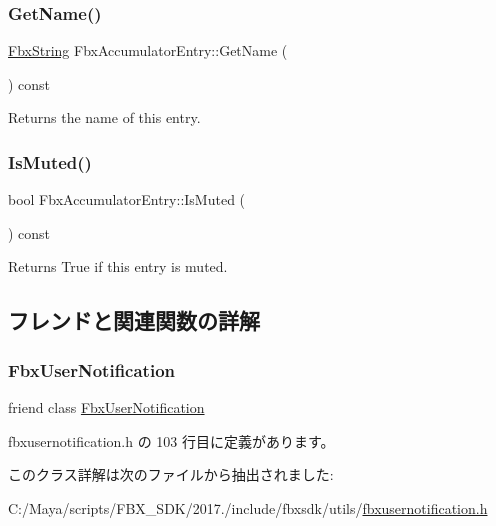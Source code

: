\mbox{\label{class_fbx_accumulator_entry_a0dbcb9bc95c823b84a8679f781d35317}} 
\subsubsection{\texorpdfstring{Get\+Name()}{GetName()}}
{\footnotesize\ttfamily \hyperlink{class_fbx_string}{Fbx\+String} Fbx\+Accumulator\+Entry\+::\+Get\+Name (\begin{DoxyParamCaption}{ }\end{DoxyParamCaption}) const}



Returns the name of this entry. 

\mbox{\label{class_fbx_accumulator_entry_ac7c575cce1b36df854f30ed8beb82260}} 
\subsubsection{\texorpdfstring{Is\+Muted()}{IsMuted()}}
{\footnotesize\ttfamily bool Fbx\+Accumulator\+Entry\+::\+Is\+Muted (\begin{DoxyParamCaption}{ }\end{DoxyParamCaption}) const}



Returns True if this entry is muted. 



\subsection{フレンドと関連関数の詳解}
\mbox{\label{class_fbx_accumulator_entry_a59b31f76d63ab836d795cdd0188a201a}} 
\subsubsection{\texorpdfstring{Fbx\+User\+Notification}{FbxUserNotification}}
{\footnotesize\ttfamily friend class \hyperlink{class_fbx_user_notification}{Fbx\+User\+Notification}\hspace{0.3cm}{\ttfamily [friend]}}



 fbxusernotification.\+h の 103 行目に定義があります。



このクラス詳解は次のファイルから抽出されました\+:\begin{DoxyCompactItemize}
\item 
C\+:/\+Maya/scripts/\+F\+B\+X\+\_\+\+S\+D\+K/2017./include/fbxsdk/utils/\hyperlink{fbxusernotification_8h}{fbxusernotification.\+h}\end{DoxyCompactItemize}
